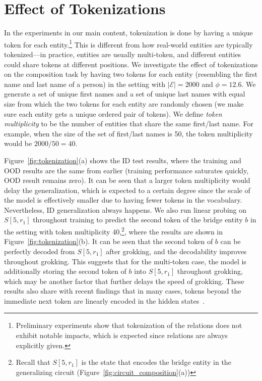 \section{Effect of Tokenizations}
\label{app:tokenization}
In the experiments in our main content, tokenization is done by having a unique token for each entity.\footnote{Preliminary experiments show that tokenization of the relations does not exhibit notable impacts, which is expected since relations are always explicitly given.} This is different from how real-world entities are typically tokenized---in practice, entities are usually multi-token, and different entities could share tokens at different positions. We investigate the effect of tokenizations on the composition task by having two tokens for each entity (resembling the first name and last name of a person) in the setting with $|\mathcal{E}|=2000$ and $\phi=12.6$. We generate a set of unique first names and a set of unique last names with equal size from which the two tokens for each entity are randomly chosen (we make sure each entity gets a unique ordered pair of tokens). We define \textit{token multiplicity} to be the number of entities that share the same first/last name. For example, when the size of the set of first/last names is \num{50}, the token multiplicity would be $2000/50=40$.

Figure~\ref{fig:tokenization}(a) shows the ID test results, where the training and OOD results are the same from earlier (training performance saturates quickly, OOD result remains zero). It can be seen that a larger token multiplicity would delay the generalization, which is expected to a certain degree since the scale of the model is effectively smaller due to having fewer tokens in the vocabulary. Nevertheless, ID generalization always happens. We also run linear probing on $S[5,r_1]$ throughout training to predict the second token of the bridge entity $b$ in the setting with token multiplicity \num{40},\footnote{Recall that $S[5,r_1]$ is the state that encodes the bridge entity in the generalizing circuit (Figure~\ref{fig:circuit_composition}(a))}, where the results are shown in Figure~\ref{fig:tokenization}(b). It can be seen that the second token of $b$ can be perfectly decoded from $S[5,r_1]$ after grokking, and the decodability improves throughout grokking. This suggests that for the multi-token case, the model is additionally storing the second token of $b$ into $S[5,r_1]$ throughout grokking, which may be another factor that further delays the speed of grokking. These results also share with recent findings that in many cases, tokens beyond the immediate next token are linearly encoded in the hidden states~\citep{wu2024language, pal-etal-2023-future, belrose2023eliciting, cai2024medusa}.

